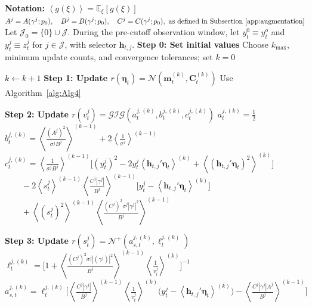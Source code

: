 \documentclass[APA,STIX1COL]{WileyNJD-v2}
\begin{document}
\begin{algorithm}
\caption{Historical-window variational Bayes (VB) coordinate updates}
\label{alg:Alg3}
\begin{algorithmic}

\State \textbf{Notation:}
\State  $\left\langle g(\xi) \right\rangle = \mathbb{E}_\xi\left[ g(\xi) \right]$
\State  \(
A^j = A(\gamma^j;p_0), \quad B^j = B(\gamma^j;p_0), \quad C^j = C(\gamma^j;p_0), \text{ as defined in Subsection~\ref{app:augmentation}}
\)
\State  Let \(\mathcal{J}_0=\{0\}\cup\mathcal{J}\). During the pre-cutoff observation window, let \(y_t^0 \equiv y_t^o\) and \(y_t^j \equiv z_t^j\) for \(j\in\mathcal{J}\), with selector \(\mathbf{h}_{t,j}\).
\State \textbf{Step 0: Set initial values}
\State Choose \(k_{\max}\), minimum update counts, and convergence tolerances; set \(k=0\)

    \State \(k \leftarrow k+1\)
    \State \textbf{Step 1: Update $r(\boldsymbol{\eta}_t)=\mathcal{N}(\mathbf m^{(k)}_t,\mathbf C^{(k)}_t)$}
    \State Use Algorithm~\ref{alg:Alg4}

        \State \textbf{Step 2: Update $r(v^j_t)=\mathcal{GIG}(a_t^{j,(k)},b_t^{j,(k)},c_t^{j,(k)})$}
            \State $a_t^{j,(k)} = \frac{1}{2}$
            \State $b_t^{j,(k)} = \left\langle \frac{(A^j)^2}{\sigma^j B^j} \right\rangle^{(k-1)} + 2 \left\langle \frac{1}{\sigma^j} \right\rangle^{(k-1)}$
            \State $c_t^{j,(k)} = \left\langle \frac{1}{\sigma^j B^j} \right\rangle^{(k-1)} \Big[ (y_t^j)^2 - 2y_t^j \left\langle  \mathbf{h}_{t,j}' \boldsymbol{\eta}_t \right\rangle^{(k)} + \left\langle (  \mathbf{h}_{t,j}' \boldsymbol{\eta}_t )^2 \right\rangle^{(k)} \Big]$
            \State $\quad \quad -2 \left\langle s^j_t \right\rangle^{(k-1)} \left\langle \frac{C^j|\gamma^j|}{B^j} \right\rangle^{(k-1)} \Big[ y_t^j - \left\langle  \mathbf{h}_{t,j}' \boldsymbol{\eta}_t \right\rangle^{(k)} \Big]$
            \State $\quad \quad + \left\langle (s^j_t)^2 \right\rangle^{(k-1)} \left\langle \frac{(C^j)^2\sigma^j|\gamma^j|^2}{B^j} \right\rangle^{(k-1)}$
        \EndFor

        \State \textbf{Step 3: Update $r(s^j_t)=\mathcal{N}^+(a_{s,t}^{j,(k)},\ell_t^{j,(k)})$}
            \State $\ell_t^{j,(k)} = \Big[ 1+\left\langle \frac{(C^j)^2 \sigma^j |(\gamma^j)|^2}{B^j} \right\rangle^{(k-1)} \left\langle \frac{1}{v^j_t} \right\rangle^{(k)} \Big]^{-1}$
            \State $a_{s,t}^{j,(k)} = \ell_t^{j,(k)}  \Big[ \left\langle \frac{C^j |\gamma^j|}{B^j} \right\rangle^{(k-1)} \left\langle \frac{1}{v^j_t} \right\rangle^{(k)} \Big( y_t^j - \left\langle  \mathbf{h}_{t,j}' \boldsymbol{\eta}_t \right\rangle^{(k)} \Big) - \left\langle \frac{C^j |\gamma^j| A^j}{B^j} \right\rangle^{(k-1)} \Big]$
        \EndFor


\end{algorithmic}
\end{algorithm}
\end{document}
